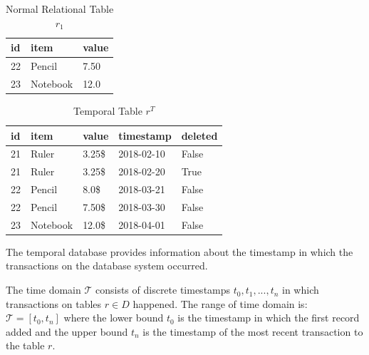 		\begin{center}
		\begin{table}[t]
			\centering
			\caption{Normal Relational Table $r_1$}
			\label{table:normal_relational_table}
			\begin{tabular}{p{4cm}p{4cm}p{4cm}}
				\hline
				id & item      & value  \\ \hline
				22 & Pencil    & 7.50 \\
				23 & Notebook & 12.0   \\ \hline
			\end{tabular}
		\end{table}

		\begin{table}[t]
			\centering
			\caption{Temporal Table $r^T$}
			\label{table:temporal_table}
			\begin{tabular}{p{1cm}p{2cm}p{3cm}p{3cm}p{2cm}}
				\hline
				id & item      & value  & timestamp  & deleted\\ \hline
				21 & Ruler    & 3.25\$  & 2018-02-10  &  False \\  
				21 & Ruler    & 3.25\$  & 2018-02-20  &  True \\
				22 & Pencil    & 8.0\$  & 2018-03-21  &  False \\
				22 & Pencil    & 7.50\$  & 2018-03-30  &  False\\
				23 & Notebook & 12.0\$  & 2018-04-01 & False \\ \hline
			\end{tabular}
		\end{table} 
		\end{center}

		The temporal database provides information about the timestamp in which the transactions on the database system occurred.
		\begin{defn}
			The time domain $\mathcal{T}$ consists of discrete timestamps $t_0,t_1,...,t_n$ in which transactions on tables $r \in D$ happened. The range of time domain is: $\mathcal{T} = [t_0,t_n]$ where the lower bound $t_0$ is the timestamp in which the first record added and the upper bound $t_n$ is the timestamp of the most recent transaction to the table $r$.
		\label{dfn:time_domain}
		\end{defn}

